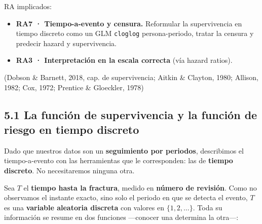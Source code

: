 \documentclass[
  letterpaper,
  DIV=11,
  numbers=noendperiod]{scrartcl}
\providecommand{\tightlist}{%
  \setlength{\itemsep}{0pt}\setlength{\parskip}{0pt}}\usepackage{longtable,booktabs,array}
\begin{document}
\begin{tcolorbox}[enhanced jigsaw, breakable, colframe=quarto-callout-note-color-frame, left=2mm, arc=.35mm, colbacktitle=quarto-callout-note-color!10!white, toprule=.15mm, colback=white, coltitle=black, rightrule=.15mm, opacitybacktitle=0.6, title=\textcolor{quarto-callout-note-color}{\faInfo}\hspace{0.5em}{Sobre esta unidad}, titlerule=0mm, toptitle=1mm, bottomtitle=1mm, leftrule=.75mm, bottomrule=.15mm, opacityback=0]

RA implicados:

\begin{itemize}
\tightlist
\item
  \textbf{RA7 · Tiempo-a-evento y censura.} Reformular la supervivencia
  en tiempo discreto como un GLM \texttt{cloglog} persona-periodo,
  tratar la censura y predecir hazard y supervivencia.
\item
  \textbf{RA3 · Interpretación en la escala correcta} (vía hazard
  ratios).
\end{itemize}

(Dobson \& Barnett, 2018, cap. de supervivencia; Aitkin \& Clayton,
1980; Allison, 1982; Cox, 1972; Prentice \& Gloeckler, 1978)

\end{tcolorbox}

\hypertarget{sec-u15-hazard}{%
\subsection{5.1 La función de supervivencia y la función de riesgo en
tiempo discreto}\label{sec-u15-hazard}}

Dado que nuestros datos son un \textbf{seguimiento por periodos},
describimos el tiempo-a-evento con las herramientas que le corresponden:
las de \textbf{tiempo discreto}. No necesitaremos ninguna otra.

Sea \(T\) el \textbf{tiempo hasta la fractura}, medido en \textbf{número
de revisión}. Como no observamos el instante exacto, sino solo el
periodo en que se detecta el evento, \(T\) es una \textbf{variable
aleatoria discreta} con valores en \(\{1,2,\dots\}\). Toda su
información se resume en dos funciones ---conocer una determina la
otra---:
\end{document}
